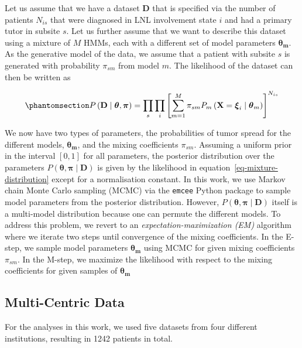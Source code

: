 \documentclass[11pt,twocolumn,twoside]{article}
\begin{document}
Let us assume that we have a dataset \(\mathbf{D}\) that is specified
via the number of patients \(N_{is}\) that were diagnosed in LNL
involvement state \(i\) and had a primary tutor in subsite \(s\). Let us
further assume that we want to describe this dataset using a mixture of
\(M\) HMMs, each with a different set of model parameters
\(\boldsymbol{\theta_m}\). As the generative model of the data, we
assume that a patient with subsite \(s\) is generated with probability
\(\pi_{sm}\) from model \(m\). The likelihood of the dataset can then be
written as

\begin{equation}\phantomsection\label{eq-mixture-distribution}{
P \left( \mathbf{D} \mid \boldsymbol{\theta}, \boldsymbol{\pi}\right) = \prod_s \prod_i \left[ \sum_{m=1}^M \pi_{sm} P_m \left( \mathbf{X}=\boldsymbol{\xi}_i \mid \boldsymbol{\theta}_m \right) \right]^{N_{is}}
}\end{equation}

We now have two types of parameters, the probabilities of tumor spread
for the different models, \(\boldsymbol{\theta_m}\), and the mixing
coefficients \(\pi_{sm}\). Assuming a uniform prior in the interval
\([0,1]\) for all parameters, the posterior distribution over the
parameters
\(P \left( \boldsymbol{\theta}, \boldsymbol{\pi} \mid \mathbf{D} \right)\)
is given by the likelihood in equation~\ref{eq-mixture-distribution}
except for a normalisation constant. In this work, we use Markov chain
Monte Carlo sampling (MCMC) via the \texttt{emcee} Python package
\autocite{foreman-mackey_emcee_2013} to sample model parameters from the
posterior distribution. However,
\(P \left( \boldsymbol{\theta}, \boldsymbol{\pi} \mid \mathbf{D} \right)\)
itself is a multi-model distribution because one can permute the
different models. To address this problem, we revert to an
\emph{expectation-maximization (EM)} algorithm where we iterate two
steps until convergence of the mixing coefficients. In the E-step, we
sample model parameters \(\boldsymbol{\theta_m}\) using MCMC for given
mixing coefficients \(\pi_{sm}\). In the M-step, we maximize the
likelihood with respect to the mixing coefficients for given samples of
\(\boldsymbol{\theta_m}\)

\subsection{Multi-Centric Data}\label{multi-centric-data}

For the analyses in this work, we used five datasets from four different
institutions, resulting in 1242 patients in total.
\end{document}
